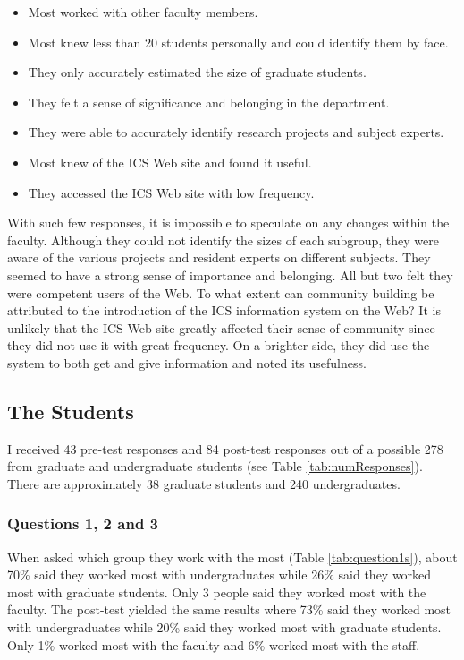 \begin{itemize}
\item{Most worked with other faculty members.}
\item{Most knew less than 20 students personally and could identify them by
face.}
\item{They only accurately estimated the size of graduate students.}
\item{They felt a sense of significance and belonging in the department.}
\item{They were able to accurately identify research projects and subject
experts.}
\item{Most knew of the ICS Web site and found it useful.}
\item{They accessed the ICS Web site with low frequency.}
\end{itemize}

With such few responses, it is impossible to speculate on any changes within
the faculty.  Although they could not identify the sizes of each subgroup, they
were aware of the various projects and resident experts on different subjects.
They seemed to have a strong sense of importance and belonging.  All but two
felt they were competent users of the Web.  To what extent can community
building be attributed to the introduction of the ICS information system on the
Web?  It is unlikely that the ICS Web site greatly affected their sense of
community since they did not use it with great frequency.  On a brighter side,
they did use the system to both get and give information and noted its
usefulness.

\subsection{The Students}

I received 43 pre-test responses and 84 post-test responses out of a possible
278 from graduate and undergraduate students (see Table
\ref{tab:numResponses}).  There are approximately 38 graduate students and 240
undergraduates.

\subsubsection{Questions 1, 2 and 3}

When asked which group they work with the most (Table \ref{tab:question1s}),
about 70\% said they worked most with undergraduates while 26\% said they
worked most with graduate students.  Only 3 people said they worked most with
the faculty.  The post-test yielded the same results where 73\% said they
worked most with undergraduates while 20\% said they worked most with graduate
students.  Only 1\% worked most with the faculty and 6\% worked most with the
staff.

